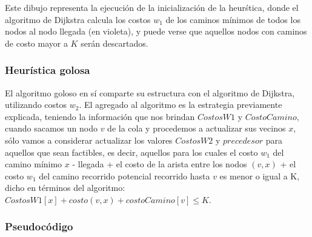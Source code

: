 Este dibujo representa la ejecuci\'on de la inicializaci\'on de la heur\'stica, donde el algoritmo de Dijkstra calcula los costos $w_1$ de los caminos m\'inimos de todos los nodos al nodo llegada (en violeta), y puede verse que aquellos nodos con caminos de costo mayor a $K$ ser\'an descartados.

\subsubsection{Heur\'istica golosa}

El algoritmo goloso en s\'i comparte su estructura con el algoritmo de Dijkstra, utilizando costos $w_2$. El agregado al algoritmo es la estrategia previamente explicada, teniendo la informaci\'on que nos brindan $CostosW1$ y $CostoCamino$, cuando sacamos un nodo $v$ de la cola y procedemos a actualizar sus vecinos $x$, s\'olo vamos a considerar actualizar los valores $CostosW2$ y $precedesor$ para aquellos que sean factibles, es decir, aquellos para los cuales el costo $w_1$ del camino m\'inimo $x$ - llegada + el costo de la arista entre los nodos $(v,x)$ + el costo $w_1$ del camino recorrido potencial recorrido hasta $v$ es menor o igual a K, dicho en t\'erminos del algoritmo: $CostosW1[x]+costo(v,x)+costoCamino[v]\leq K$.


\subsubsection{Pseudoc\'odigo}

